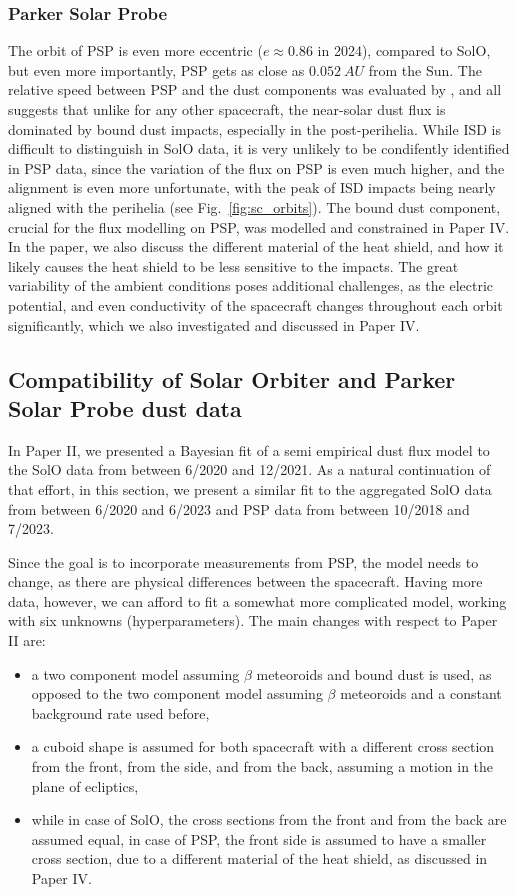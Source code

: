 \subsubsection{Parker Solar Probe}

The orbit of PSP is even more eccentric ($e \approx 0.86$ in 2024), compared to SolO, but even more importantly, PSP gets as close as $\SI{0.052}{AU}$ from the Sun. The relative speed between PSP and the dust components was evaluated by \citet{szalay2020near}, and all suggests that unlike for any other spacecraft, the near-solar dust flux is dominated by bound dust impacts, especially in the post-perihelia. While ISD is difficult to distinguish in SolO data, it is very unlikely to be condifently identified in PSP data, since the variation of the flux on PSP is even much higher, and the alignment is even more unfortunate, with the peak of ISD impacts being nearly aligned with the perihelia (see Fig.~\ref{fig:sc_orbits}). The bound dust component, crucial for the flux modelling on PSP, was modelled and constrained in Paper IV. In the paper, we also discuss the different material of the heat shield, and how it likely causes the heat shield to be less sensitive to the impacts. The great variability of the ambient conditions poses additional challenges, as the electric potential, and even conductivity of the spacecraft changes throughout each orbit significantly, which we also investigated and discussed in Paper IV.

\subsection{Compatibility of Solar Orbiter and Parker Solar Probe dust data}

In Paper II, we presented a Bayesian fit of a semi empirical dust flux model to the SolO data from between 6/2020 and 12/2021. As a natural continuation of that effort, in this section, we present a similar fit to the aggregated SolO data from between 6/2020 and 6/2023 and PSP data from between 10/2018 and 7/2023. 

Since the goal is to incorporate measurements from PSP, the model needs to change, as there are physical differences between the spacecraft. Having more data, however, we can afford to fit a somewhat more complicated model, working with six unknowns (hyperparameters). The main changes with respect to Paper II are:
\begin{itemize}
    \item a two component model assuming $\beta$ meteoroids and bound dust is used, as opposed to the two component model assuming $\beta$ meteoroids and a constant background rate used before,
    \item a cuboid shape is assumed for both spacecraft with a different cross section from the front, from the side, and from the back, assuming a motion in the plane of ecliptics, 
    \item while in case of SolO, the cross sections from the front and from the back are assumed equal, in case of PSP, the front side is assumed to have a smaller cross section, due to a different material of the heat shield, as discussed in Paper IV.
\end{itemize}

